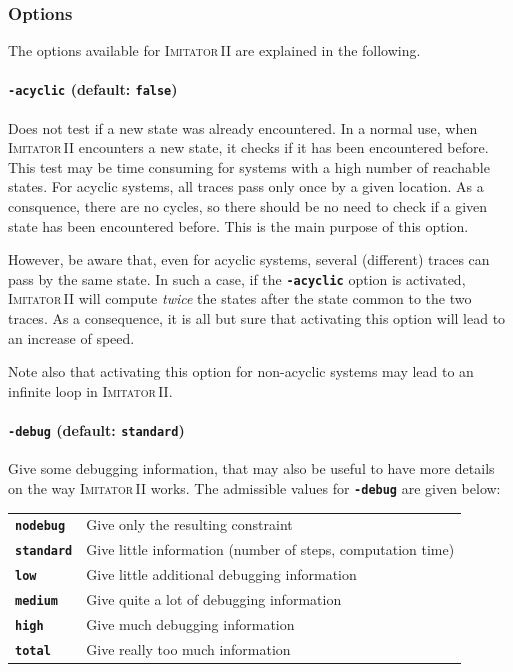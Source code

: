 \documentclass[a4paper,10pt]{article}
\newcommand{\imitatordeux}{\textsc{Imitator}\,II}
\newcommand{\code}[1]{\textbf{\texttt{#1}}}
\begin{document}
\subsubsection{Options} \label{sss:options}

The options available for \imitatordeux{} are explained in the following.

\paragraph{\code{-acyclic} (default: \code{false})}
Does not test if a new state was already encountered.
In a normal use, when \imitatordeux{} encounters a new state, it checks if it has been encountered before.
This test may be time consuming for systems with a high number of reachable states.
For acyclic systems, all traces pass only once by a given location.
As a consquence, there are no cycles, so there should be no need to check if a given state has been encountered before.
This is the main purpose of this option.

However, be aware that, even for acyclic systems, several (different) traces can pass by the same state.
In such a case, if the \code{-acyclic} option is activated, \imitatordeux{} will compute \emph{twice} the states after the state common to the two traces.
As a consequence, it is all but sure that activating this option will lead to an increase of speed.

Note also that activating this option for non-acyclic systems may lead to an infinite loop in \imitatordeux{}.


\paragraph{\code{-debug} (default: \code{standard})}

Give some debugging information, that may also be useful to have more details on the way \imitatordeux{} works.
The admissible values for \code{-debug} are given below:

\begin{tabular}{@{} l @{\ \ } l}
 \code{nodebug} & Give only the resulting constraint \\
 \code{standard} & Give little information (number of steps, computation time)\\
 \code{low} & Give little additional debugging information\\
 \code{medium} & Give quite a lot of debugging information\\
 \code{high} & Give much debugging information\\
 \code{total} & Give really too much information\\
\end{tabular}
\end{document}

